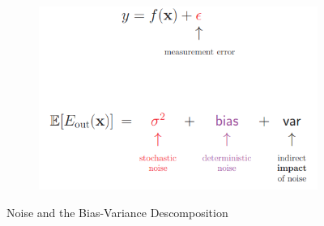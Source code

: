 \documentclass[11pt,a4paper]{article}
\theoremstyle{definition}
\begin{document}
\begin{itemize}
\begin{figure}[H]
		\begin{subfigure}{.5\textwidth}
  		\centering
  		\includegraphics[width=1\textwidth]{images/noise_vb_des2}
  		\caption{}
  		\label{fig:sub2}
		\end{subfigure}
		\caption{Noise and the Bias-Variance Descomposition}
		\label{fig:test}
	\end{figure}
	\end{itemize}
	
\end{document}
